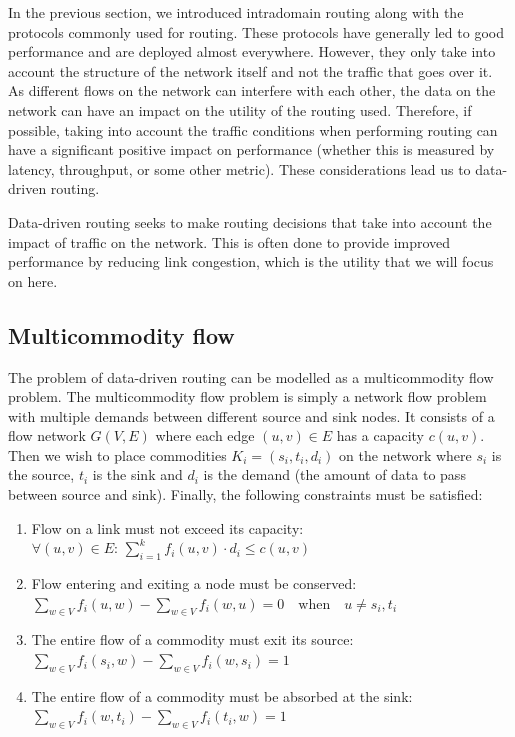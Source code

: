 In the previous section, we introduced intradomain routing along with the protocols commonly used for routing. These protocols have generally led to good performance and are deployed almost everywhere. However, they only take into account the structure of the network itself and not the traffic that goes over it. As different flows on the network can interfere with each other, the data on the network can have an impact on the utility of the routing used. Therefore, if possible, taking into account the traffic conditions when performing routing can have a significant positive impact on performance (whether this is measured by latency, throughput, or some other metric). These considerations lead us to data-driven routing\cite{shi2013ddrp}.

Data-driven routing seeks to make routing decisions that take into account the impact of traffic on the network. This is often done to provide improved performance by reducing link congestion, which is the utility that we will focus on here.

\subsection{Multicommodity flow}
\label{section:multicommodity}

The problem of data-driven routing can be modelled as a multicommodity flow problem\cite{Barnhart2001}. The multicommodity flow problem is simply a network flow problem with multiple demands between different source and sink nodes. It consists of a flow network $G(V,E)$ where each edge $(u,v) \in E$ has a capacity $c(u,v)$. Then we wish to place commodities $K_i = (s_i, t_i, d_i)$ on the network where $s_i$ is the source, $t_i$ is the sink and $d_i$ is the demand (the amount of data to pass between source and sink). Finally, the following constraints must be satisfied:

\begin{enumerate}
    \item Flow on a link must not exceed its capacity:\\
    $\forall (u,v)\in E:\,\sum_{i=1}^{k} f_i(u,v)\cdot d_i \leq c(u,v)$
    \item Flow entering and exiting a node must be conserved:\\
    $\sum_{w \in V} f_i(u,w) - \sum_{w \in V} f_i(w,u) = 0 \quad \mathrm{when} \quad u \neq s_i, t_i$
    \item The entire flow of a commodity must exit its source:\\
    $\sum_{w \in V} f_i(s_i,w) - \sum_{w \in V} f_i(w,s_i) = 1$
    \item The entire flow of a commodity must be absorbed at the sink:\\
    $\sum_{w \in V} f_i(w,t_i) - \sum_{w \in V} f_i(t_i,w) = 1$
\end{enumerate}


